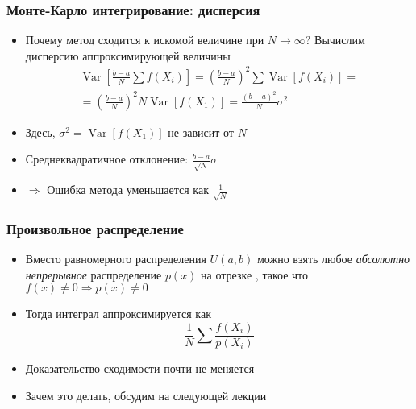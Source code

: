 \documentclass[handout,10pt]{beamer}
\begin{document}
\begin{frame}[fragile]
\frametitle{Монте-Карло интегрирование: дисперсия}
\begin{itemize}
\item Почему метод сходится к искомой величине при \begin{math}N\rightarrow \infty\end{math}? \pause Вычислим дисперсию аппроксимирующей величины
\begin{gather*}
\operatorname{Var}\left[\frac{b-a}{N}\sum f(X_i)\right] = \left(\frac{b-a}{N}\right)^2\sum\operatorname{Var}[f(X_i)] = \\
= \left(\frac{b-a}{N}\right)^2 N\operatorname{Var}[f(X_1)] = \frac{(b-a)^2}{N}\sigma^2
\end{gather*}
\pause
\item Здесь, \begin{math}\sigma^2 = \operatorname{Var}[f(X_1)]\end{math} не зависит от \begin{math}N\end{math}
\pause
\item Среднеквадратичное отклонение: \begin{math}\frac{b-a}{\sqrt N}\sigma\end{math}
\pause
\item \begin{math}\Longrightarrow\end{math} Ошибка метода уменьшается как \begin{math}\frac{1}{\sqrt N}\end{math}
\end{itemize}
\end{frame}

\begin{frame}[fragile]
\frametitle{Произвольное распределение}
\begin{itemize}
\item Вместо равномерного распределения \begin{math}U(a,b)\end{math} можно взять любое \textit{абсолютно непрерывное} распределение \begin{math}p(x)\end{math} на отрезке \begin{math}[a,b]\end{math}, такое что \begin{math}f(x)\neq 0 \Rightarrow p(x)\neq 0\end{math}
\pause
\item Тогда интеграл аппроксимируется как
\begin{equation*}
\frac{1}{N}\sum \frac{f(X_i)}{p(X_i)}
\end{equation*}
\pause
\item Доказательство сходимости почти не меняется
\pause
\item Зачем это делать, обсудим на следующей лекции
\end{itemize}
\end{frame}
\end{document}
